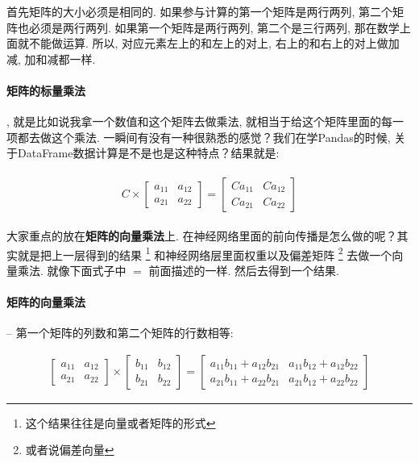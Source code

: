 首先矩阵的大小必须是相同的. 如果参与计算的第一个矩阵是两行两列, 第二个矩阵也必须是两行两列. 如果第一个矩阵是两行两列, 第二个是三行两列, 那在数学上面就不能做运算. 所以, 对应元素左上的和左上的对上, 右上的和右上的对上做加减, 加和减都一样. 

\paragraph{矩阵的标量乘法}, 就是比如说我拿一个数值和这个矩阵去做乘法, 就相当于给这个矩阵里面的每一项都去做这个乘法. 一瞬间有没有一种很熟悉的感觉？我们在学Pandas的时候, 关于DataFrame数据计算是不是也是这种特点？结果就是:

\begin{align*}
  \begin{split} C \times \begin{bmatrix} a_{11} & a_{12} \\ a_{21} & a_{22} \end{bmatrix}= \begin{bmatrix} Ca_{11} & Ca_{12} \\ Ca_{21} & Ca_{22} \end{bmatrix} \end{split}
\end{align*}

大家重点的放在\textbf{矩阵的向量乘法}上. 在神经网络里面的前向传播是怎么做的呢？其实就是把上一层得到的结果 \footnote{这个结果往往是向量或者矩阵的形式} 和神经网络层里面权重以及偏差矩阵 \footnote{或者说偏差向量} 去做一个向量乘法. 就像下面式子中 $ = $ 前面描述的一样. 然后去得到一个结果. 

\paragraph{矩阵的向量乘法} -- 第一个矩阵的列数和第二个矩阵的行数相等:

\begin{align*}
  \begin{bmatrix} a_{11} & a_{12} \\ a_{21} & a_{22} \end{bmatrix} \times \begin{bmatrix} b_{11} & b_{12} \\ b_{21} & b_{22} \end{bmatrix}=\begin{bmatrix} a_{11}b_{11} + a_{12}b_{21} & a_{11}b_{12} + a_{12}b_{22} \\ a_{21}b_{11} + a_{22}b_{21} & a_{21}b_{12} + a_{22}b_{22} \end{bmatrix}
\end{align*}

